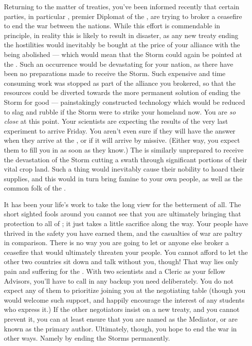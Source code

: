 \documentclass[char]{GL2020}
\begin{document}
Returning to the matter of treaties, you've been informed recently that certain parties, in particular \cHeadDiplomat{\full}, premier Diplomat of the \pShip{}, are trying to broker a ceasefire to end the war between the nations. While this effort is commendable in principle, in reality this is likely to result in disaster, as any new treaty ending the hostilities would inevitably be bought at the price of your alliance with the \pFarm{} being abolished — which would mean that the Storm could again be pointed at the \pTech{}. Such an occurrence would be devastating for your nation, as there have been no preparations made to receive the Storm. Such expensive and time consuming work was stopped as part of the alliance you brokered, so that the resources could be diverted towards the more permanent solution of ending the Storm for good — painstakingly constructed technology which would be reduced to slag and rubble if the Storm were to strike your homeland now. You are \emph{so close} at this point. Your scientists are expecting the results of the very last experiment to arrive Friday. You aren’t even sure if they will have the answer when they arrive at the \pSchool{}, or if it will arrive by missive. (Either way, you expect them to fill you in as soon as they know.) The \pFarm{} is similarly unprepared to receive the devastation of the Storm cutting a swath through significant portions of their vital crop land. Such a thing would inevitably cause their nobility to hoard their supplies, and this would in turn bring famine to your own people, as well as the common folk of the \pFarm{}. 

It has been your life's work to take the long view for the betterment of all. The short sighted fools around you cannot see that you are ultimately bringing that protection to all of \pEarth{}; it just takes a little sacrifice along the way. Your people have thrived in the safety you have earned them, and the casualties of war are paltry in comparison. There is no way you are going to let \cHeadDiplomat{} or anyone else broker a ceasefire that would ultimately threaten your people. You cannot afford to let the other two countries sit down and talk without you, though! That way lies only pain and suffering for the \pTech{}. With two scientists and a Cleric as your fellow Advisors, you’ll have to call in any backup you need deliberately. You do not expect any of them to prioritize joining you at the negotiating table (though you would welcome such support, and happily encourage the interest of any \pTech{} students who express it.) If the other negotiators insist on a new treaty, and you cannot prevent it, you can at least ensure that you are named as the Mediator, or are known as the primary author. Ultimately, though, you hope to end the war in other ways. Namely by ending the Storms permanently.
\end{document}
